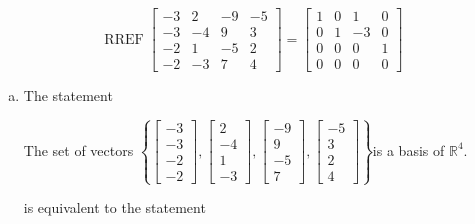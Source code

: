 \begin{exerciseAnswer} 


\[\operatorname{RREF} \left[\begin{array}{cccc}
-3 & 2 & -9 & -5 \\
-3 & -4 & 9 & 3 \\
-2 & 1 & -5 & 2 \\
-2 & -3 & 7 & 4
\end{array}\right] = \left[\begin{array}{cccc}
1 & 0 & 1 & 0 \\
0 & 1 & -3 & 0 \\
0 & 0 & 0 & 1 \\
0 & 0 & 0 & 0
\end{array}\right] \]


\begin{enumerate}[(a)]
\item The statement 
\begin{center}\begin{minipage}{0.8\textwidth}
 The set of vectors \( \left\{ \left[\begin{array}{c}
-3 \\
-3 \\
-2 \\
-2
\end{array}\right] , \left[\begin{array}{c}
2 \\
-4 \\
1 \\
-3
\end{array}\right] , \left[\begin{array}{c}
-9 \\
9 \\
-5 \\
7
\end{array}\right] , \left[\begin{array}{c}
-5 \\
3 \\
2 \\
4
\end{array}\right] \right\} \)is a basis of \(\mathbb{R}^4\). 
\end{minipage}\end{center}
     is equivalent to the statement 
\begin{center}\begin{minipage}{0.8\textwidth}
 The set of vectors \( \left\{ \left[\begin{array}{c}
-3 \\
-3 \\

\end{array}
\end{minipage}
\end{center}
\end{enumerate}
\end{exerciseAnswer}

